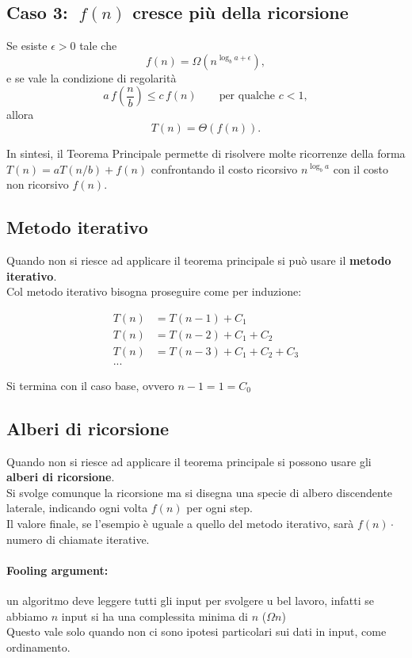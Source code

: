 \documentclass[a4paper,12pt]{article}
\begin{document}
\subsection{Caso 3: $\;f(n)$ cresce più della ricorsione}
Se esiste $\epsilon > 0$ tale che
\[
f(n) = \Omega\!\left(n^{\log_b a + \epsilon}\right),
\]
e se vale la condizione di regolarità
\[
a\, f\!\left(\frac{n}{b}\right) \le c\, f(n)
\qquad \text{per qualche } c < 1,
\]
allora
\[
T(n) = \Theta\!\left(f(n)\right).
\]

\bigskip

\noindent
In sintesi, il Teorema Principale permette di risolvere molte ricorrenze
della forma $T(n) = a T(n/b) + f(n)$ confrontando il costo ricorsivo
$n^{\log_b a}$ con il costo non ricorsivo $f(n)$.

\subsection{Metodo iterativo}
Quando non si riesce ad applicare il teorema principale si può usare il \textbf{metodo iterativo}.\\
Col metodo iterativo bisogna proseguire come per induzione:
\begin{center}
  \begin{align*}
    T(n) &= T(n-1) + C_1\\
    T(n) &= T(n-2) + C_1 + C_2\\
    T(n) &= T(n-3) + C_1 + C_2 + C_3\\
    ...
  \end{align*}
\end{center}
Si termina con il caso base, ovvero $n-1 = 1 = C_0$


\subsection{Alberi di ricorsione}
Quando non si riesce ad applicare il teorema principale si possono usare gli \textbf{alberi di ricorsione}.\\
Si svolge comunque la ricorsione ma si disegna una specie di albero discendente laterale, indicando ogni volta $f(n)$ per ogni step.\\
Il valore finale, se l'esempio è uguale a quello del metodo iterativo, sarà $f(n) \cdot $ numero di chiamate iterative.

\paragraph{Fooling argument: }un algoritmo deve leggere tutti gli input per svolgere u bel lavoro, infatti se abbiamo $n$ input si ha una complessita minima di $n$ ($\Omega n$)\\
Questo vale solo quando non ci sono ipotesi particolari sui dati in input, come ordinamento.
\end{document}
